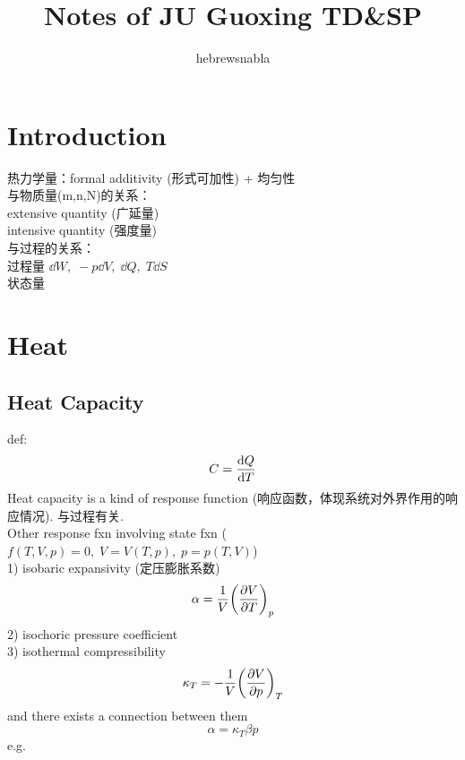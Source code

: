 \documentclass[UTF8]{ctexart} %
\title{Notes of JU Guoxing TD\&SP}
\author{hebrewsnabla}
\numberwithin{equation}{subsection}
\begin{document}
\maketitle
\section{Introduction}
热力学量：formal additivity (形式可加性) + 均匀性\\
与物质量(m,n,N)的关系：\\
extensive quantity (广延量)\\
intensive quantity (强度量)\\
与过程的关系：\\
过程量  $\dd W,\;-p\dd V,\;\dd Q,\;T\dd S$\\
状态量

\section{Heat}

\setcounter{subsection}{1}
\subsection{Heat Capacity}
def:
\begin{equation}\label{key}
C=\dv{Q}{T}
\end{equation}
Heat capacity is a kind of response function (响应函数，体现系统对外界作用的响应情况). 与过程有关.\\

Other response fxn involving state fxn ($f(T,V,p)=0,\;V=V(T,p),\;p=p(T,V)$)\\
1) isobaric expansivity (定压膨胀系数)
\begin{equation}\label{key}
\alpha=\dfrac{1}{V}\qty(\pdv{V}{T})_p
\end{equation}
2) isochoric pressure coefficient\\
3) isothermal compressibility\\
\begin{equation}\label{key}
\kappa_T=-\dfrac{1}{V}\qty(\pdv{V}{p})_T
\end{equation}
and there exists a connection between them
\begin{equation}\label{key}
\alpha=\kappa_T\beta p
\end{equation}
e.g.\\
\end{document}

